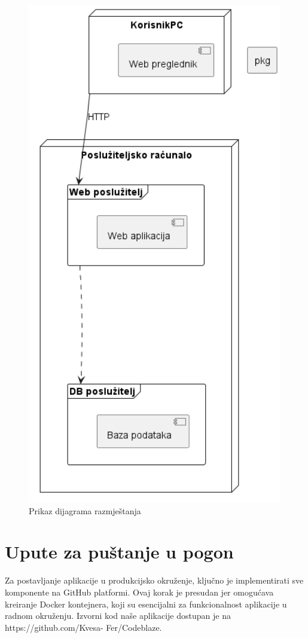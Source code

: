 		\begin{figure} [H]
			\centering
			\includegraphics[width=0.7\linewidth]{dijagrami/dijagramRazmjestanja.png}
			\caption{Prikaz dijagrama razmještanja}
			\label{fig:Prikaz dijagrama razmještanja}
		\end{figure}

			\eject 
		
		\section{Upute za puštanje u pogon}

		Za postavljanje aplikacije u produkcijsko okruženje, ključno je implementirati sve komponente na GitHub platformi. Ovaj korak je presudan jer omogućava kreiranje Docker kontejnera, koji su esencijalni za funkcionalnost aplikacije u radnom okruženju. Izvorni kod naše aplikacije dostupan je na https://github.com/Kvesa- Fer/Codeblaze.

